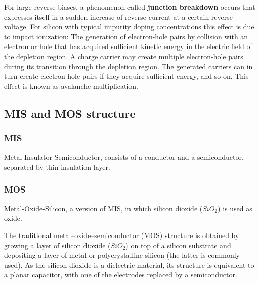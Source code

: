 \documentclass[main]{subfiles}
\begin{document}
For large reverse biases, a phenomenon called \textbf{junction breakdown} occurs that expresses itself in a sudden increase of reverse current at a certain reverse voltage. For silicon with typical impurity doping concentrations this effect is due to impact ionization: The generation of electron-hole pairs by collision with an electron or hole that has acquired sufficient kinetic energy in the electric field of the depletion region. A charge carrier may create multiple electron-hole pairs during its transition through the depletion region. The generated carriers can in turn create electron-hole pairs if they acquire sufficient energy, and so on. This effect is known as avalanche multiplication.


\subsection{MIS and MOS structure}

\subsubsection{MIS}  Metal-Insulator-Semiconductor, consists of a conductor and a semiconductor, separated by thin insulation layer.
\subsubsection{MOS}  Metal-Oxide-Silicon, a version of MIS, in which silicon dioxide ($SiO_2$) is used as oxide.

The traditional metal–oxide–semiconductor (MOS) structure is obtained by growing a layer of silicon dioxide ($SiO_2$) on top of a silicon substrate and depositing a layer of metal or polycrystalline silicon (the latter is commonly used). As the silicon dioxide is a dielectric material, its structure is equivalent to a planar capacitor, with one of the electrodes replaced by a semiconductor.
\end{document}
